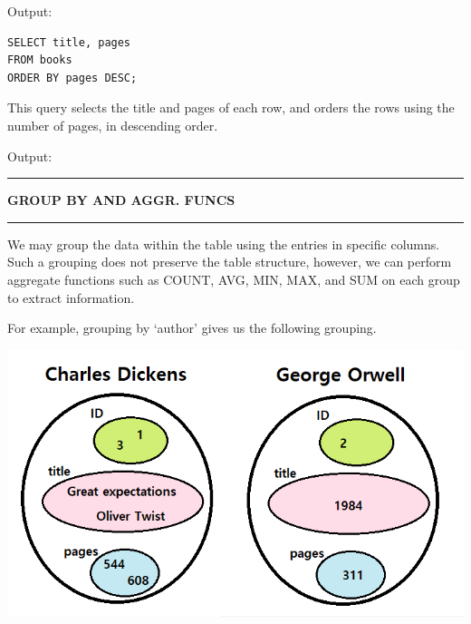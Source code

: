 \documentclass[8pt]{extarticle}
\newcommand{\heading}[1]{%
    \noindent
    \rule{\linewidth}{0.4pt}
    \begin{center}
        \vspace{-1ex}
        \textbf{#1}        
        \vspace{-2.5ex}
    \end{center}
    \rule{\linewidth}{0.4pt}
}
\begin{document}
\begin{multicols}{4}
Output:
\begin{center}
\end{center}
\vspace*{0.5ex}

\vspace{0.5ex}
\begin{lstlisting}[style=sql]
SELECT title, pages
FROM books
ORDER BY pages DESC;
\end{lstlisting}
\vspace{0.5ex}

This query selects the title and pages of each row, and orders the rows using the number of pages, in descending order.
\vspace{1ex}

Output:
\begin{center}
\end{center}
\vspace*{1.5ex}

\vspace{1ex}

\heading{GROUP BY AND AGGR. FUNCS}

We may group the data within the table using the entries in specific columns. Such a grouping does not preserve the table structure, however, we can perform aggregate functions such as COUNT, AVG, MIN, MAX, and SUM on each group to extract information. 

For example, grouping by `author' gives us the following grouping.
\begin{center}
\includegraphics[scale = 0.3]{sql_group_by_visual.png}
\end{center}


\end{multicols}
\end{document}
